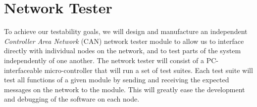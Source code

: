 \section{Network Tester}

To achieve our testability goals, we will design and manufacture an independent \emph{Controller Area Network} (CAN) network tester module to allow us to interface directly with individual nodes on the network, and to test parts of the system independently of one another. The network tester will consist of a PC-interfaceable micro-controller that will run a set of test suites. Each test suite will test all functions of a given module by sending and receiving the expected messages on the network to the module. This will greatly ease the development and debugging of the software on each node.
